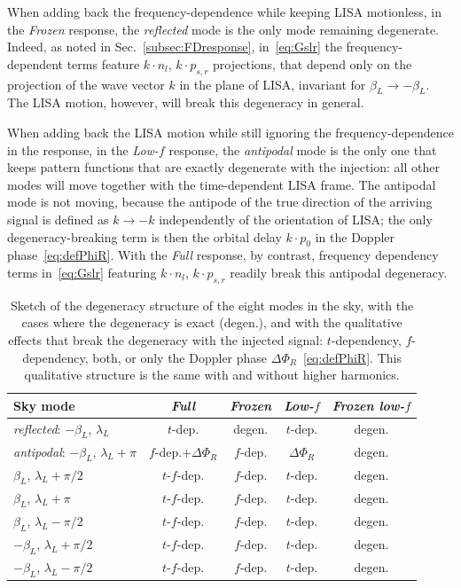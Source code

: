 \documentclass[aps,showpacs,twocolumn,prd,superscriptaddress,nofootinbib]{revtex4-1}
\newcommand\betaL{{\beta_{L}}}
\newcommand\lambdaL{{\lambda_{L}}}
\begin{document}
When adding back the frequency-dependence while keeping LISA motionless, in the \textit{Frozen} response, the \textit{reflected} mode is the only mode remaining degenerate. Indeed, as noted in Sec.~\ref{subsec:FDresponse}, in~\eqref{eq:Gslr} the frequency-dependent terms feature $k\cdot n_{l}$, $k \cdot p_{s,r}$ projections, that depend only on the projection of the wave vector $k$ in the plane of LISA, invariant for $\betaL \rightarrow -\betaL$. The LISA motion, however, will break this degeneracy in general.

When adding back the LISA motion while still ignoring the frequency-dependence in the response, in the \textit{Low-$f$} response, the \textit{antipodal} mode is the only one that keeps pattern functions that are exactly degenerate with the injection: all other modes will move together with the time-dependent LISA frame. The antipodal mode is not moving, because the antipode of the true direction of the arriving signal  is defined as $k \rightarrow -k$ independently of the orientation of LISA; the only degeneracy-breaking term is then the orbital delay $k \cdot p_{0}$ in the Doppler phase~\eqref{eq:defPhiR}. With the \textit{Full} response, by contrast, frequency dependency terms in~\eqref{eq:Gslr} featuring $k\cdot n_{l}$, $k \cdot p_{s,r}$ readily break this antipodal degeneracy.

\begin{table}
	\begin{tabularx}{.48\textwidth}{|X||c|c|c|c|}
		\hline
		Sky mode & \textit{Full} & \textit{Frozen} & \textit{Low-$f$} & \textit{Frozen low-$f$} \\
		\hline
		\textit{reflected}: \newline $-\betaL$, $\lambdaL$ & $t$-dep. & degen. & $t$-dep. & degen.  \\
		\hline
		\textit{antipodal}: \newline $-\betaL$, $\lambdaL + \pi$ & $f$-dep.$+\Delta \Phi_{R}$ & $f$-dep. & $\Delta \Phi_{R}$ & degen.  \\
		\hline
		$\betaL$, $\lambdaL + \pi/2$ & $t$-$f$-dep. & $f$-dep. & $t$-dep. & degen.  \\
		\hline
		$\betaL$, $\lambdaL + \pi$ & $t$-$f$-dep. & $f$-dep. & $t$-dep. & degen.  \\
		\hline
		$\betaL$, $\lambdaL - \pi/2$ & $t$-$f$-dep. & $f$-dep. & $t$-dep. & degen.  \\
		\hline
		$-\betaL$, $\lambdaL + \pi/2$ & $t$-$f$-dep. & $f$-dep. & $t$-dep. & degen.  \\
		\hline
		$-\betaL$, $\lambdaL - \pi/2$ & $t$-$f$-dep. & $f$-dep. & $t$-dep. & degen.  \\
		\hline
	\end{tabularx}
	\caption{Sketch of the degeneracy structure of the eight modes in the sky, with the cases where the degeneracy is exact (degen.), and with the qualitative effects that break the degeneracy with the injected signal: $t$-dependency, $f$-dependency, both, or only the Doppler phase $\Delta \Phi_{R}$~\eqref{eq:defPhiR}. This qualitative structure is the same with and without higher harmonics.}
	\label{tab:MBHBdegen}
\end{table} 
\end{document}
